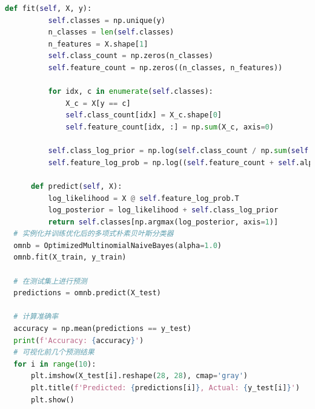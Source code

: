\documentclass[12pt]{article}
\begin{document}
\begin{lstlisting}[language=Python]
      def fit(self, X, y):
          self.classes = np.unique(y)
          n_classes = len(self.classes)
          n_features = X.shape[1]
          self.class_count = np.zeros(n_classes)
          self.feature_count = np.zeros((n_classes, n_features))
  
          for idx, c in enumerate(self.classes):
              X_c = X[y == c]
              self.class_count[idx] = X_c.shape[0]
              self.feature_count[idx, :] = np.sum(X_c, axis=0)
  
          self.class_log_prior = np.log(self.class_count / np.sum(self.class_count))
          self.feature_log_prob = np.log((self.feature_count + self.alpha) / (self.class_count[:, None] + self.alpha * n_features))
  
      def predict(self, X):
          log_likelihood = X @ self.feature_log_prob.T
          log_posterior = log_likelihood + self.class_log_prior
          return self.classes[np.argmax(log_posterior, axis=1)]
  # 实例化并训练优化后的多项式朴素贝叶斯分类器
  omnb = OptimizedMultinomialNaiveBayes(alpha=1.0)
  omnb.fit(X_train, y_train)
  
  # 在测试集上进行预测
  predictions = omnb.predict(X_test)
  
  # 计算准确率
  accuracy = np.mean(predictions == y_test)
  print(f'Accuracy: {accuracy}')
  # 可视化前几个预测结果
  for i in range(10):
      plt.imshow(X_test[i].reshape(28, 28), cmap='gray')
      plt.title(f'Predicted: {predictions[i]}, Actual: {y_test[i]}')
      plt.show()
  
\end{lstlisting}
\end{document}
